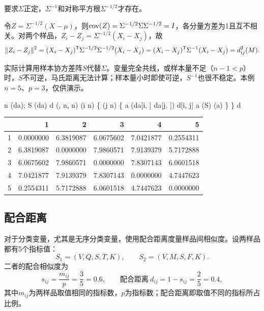 要求$\Sigma$正定，$\Sigma^{-1}$和对称平方根$\Sigma^{-1/2}$才存在。
\begin{zm}[马氏距离即白化后的欧氏距离]
令$Z=\Sigma^{-1/2}(X-\mu)$，则$\operatorname{cov}(Z)=\Sigma^{-1/2}\Sigma\Sigma^{-1/2}=I$，各分量方差为1且互不相关。对两个样品，$Z_i-Z_j=\Sigma^{-1/2}(X_i-X_j)$，故
\[
\|Z_i-Z_j\|^2=(X_i-X_j)^{\mathsf T}\Sigma^{-1/2}\Sigma^{-1/2}(X_i-X_j)=(X_i-X_j)^{\mathsf T}\Sigma^{-1}(X_i-X_j)=d_{ij}^2(M).
\]
\end{zm}
实际计算用样本协方差阵$S$代替$\Sigma$。变量完全共线，或样本量不足（$n-1<p$）时，$S$不可逆，马氏距离无法计算；样本量小时即使可逆，$S^{-1}$也很不稳定。本例$n=5$、$p=3$，仅供演示。
\begin{code}
n \ROperator{<-} (da); S \ROperator{<-} (da)
d \ROperator{<-} (, n, n)
 (i  \ROperator{:}n) \{
   (j  \ROperator{:}n) \{
    a \ROperator{<-} (da[i, ] \ROperator{-} da[j, ])
    d[i, j] \ROperator{<-} a \ROperator{\%*\%} (S) \ROperator{\%*\%} (a)
  \}
\}
d
\end{code}
\par\addvspace{5pt}\begin{center}\begin{minipage}{\linewidth}\centering
\small
{}
\begin{tabular}{lrrrrr}\toprule
 &{\bfseries  1 }&{\bfseries  2 }&{\bfseries  3 }&{\bfseries  4 }&{\bfseries  5}\\\midrule
1 & 0.0000000 & 6.3819087 & 6.0675602 & 7.0421877 & 0.2554311\\
2 & 6.3819087 & 0.0000000 & 7.9860571 & 7.9139379 & 5.7172888\\
3 & 6.0675602 & 7.9860571 & 0.0000000 & 7.8307143 & 6.0601518\\
4 & 7.0421877 & 7.9139379 & 7.8307143 & 0.0000000 & 4.7447623\\
5 & 0.2554311 & 5.7172888 & 6.0601518 & 4.7447623 & 0.0000000\\
\bottomrule\end{tabular}
\end{minipage}\end{center}

\subsection{配合距离}
对于分类变量，尤其是无序分类变量，使用配合距离度量样品间相似度。设两样品都有5个指标值：
\[
S_1=(V,Q,S,T,K),\qquad S_2=(V,M,S,F,K).
\]
二者的配合相似度为
\[
s_{ij}=\frac{m_{ij}}{p}=\frac35=0.6,\qquad\text{配合距离}\ d_{ij}=1-s_{ij}=\frac25=0.4,
\]
其中$m_{ij}$为两样品取值相同的指标数，$p$为指标数；配合距离即取值不同的指标所占比例。

